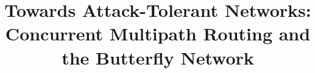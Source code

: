 \documentclass{sig-alternate-05-2015}
\begin{document}






%

\title{Towards Attack-Tolerant Networks: Concurrent Multipath Routing and the Butterfly Network}
%
%
%
%
%
\end{document}
